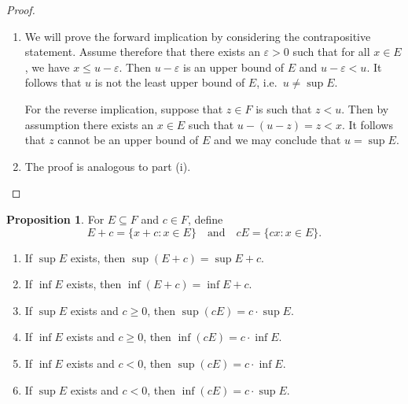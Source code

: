 \documentclass[12pt]{article}
\theoremstyle{definition}
\newtheorem{proposition}[definition]{Proposition}
\begin{document}
\begin{proof}

    \begin{enumerate}[label = (\roman*)]
        \item We will prove the forward implication by considering the contrapositive statement. Assume therefore that there exists an \( \varepsilon > 0 \) such that for all \( x \in E \), we have \( x \leq u - \varepsilon \). Then \( u - \varepsilon \) is an upper bound of \( E \) and \( u - \varepsilon < u \). It follows that \( u \) is not the least upper bound of \( E \), i.e.\ \( u \neq \sup E \).

        For the reverse implication, suppose that \( z \in F \) is such that \( z < u \). Then by assumption there exists an \( x \in E \) such that \( u - (u - z) = z < x \). It follows that \( z \) cannot be an upper bound of \( E \) and we may conclude that \( u = \sup E \).

        \item The proof is analogous to part (i). \qedhere
    \end{enumerate}

\end{proof}

\begin{proposition}
\label{prop:add_mult_constant}
    For \( E \subseteq F \) and \( c \in F \), define
    \[
        E + c = \{ x + c : x \in E \} \quad \text{and} \quad cE = \{ cx : x \in E \}.
    \]

    \begin{enumerate}[label = (\roman*)]
        \item If \( \sup E \) exists, then \( \sup (E + c) = \sup E + c \).
        
        \item If \( \inf E \) exists, then \( \inf (E + c) = \inf E + c \).
        
        \item If \( \sup E \) exists and \( c \geq 0 \), then \( \sup (cE) = c \cdot \sup E \).
        
        \item If \( \inf E \) exists and \( c \geq 0 \), then \( \inf (cE) = c \cdot \inf E \).
        
        \item If \( \inf E \) exists and \( c < 0 \), then \( \sup (cE) = c \cdot \inf E \).

        \item If \( \sup E \) exists and \( c < 0 \), then \( \inf (cE) = c \cdot \sup E \).
    \end{enumerate}
\end{proposition}
\end{document}
